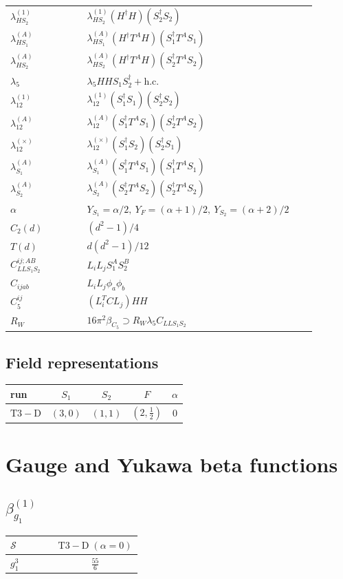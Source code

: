 \documentclass[9pt]{article}
\begin{document}
\begin{longtable}{@{}p{0.23\linewidth}p{0.69\linewidth}@{}}
$\lambda_{HS_2}^{(1)}$ & $\lambda_{HS_2}^{(1)}(H^\dagger H)(S_2^\dagger S_2)$ \\
$\lambda_{HS_1}^{(A)}$ & $\lambda_{HS_1}^{(A)}(H^\dagger T^AH)(S_1^\dagger T^AS_1)$ \\
$\lambda_{HS_2}^{(A)}$ & $\lambda_{HS_2}^{(A)}(H^\dagger T^AH)(S_2^\dagger T^AS_2)$ \\
$\lambda_5$ & $\lambda_5HHS_1S_2^\dagger+\mathrm{h.c.}$ \\
$\lambda_{12}^{(1)}$ & $\lambda_{12}^{(1)}(S_1^\dagger S_1)(S_2^\dagger S_2)$ \\
$\lambda_{12}^{(A)}$ & $\lambda_{12}^{(A)}(S_1^\dagger T^AS_1)(S_2^\dagger T^AS_2)$ \\
$\lambda_{12}^{(\times)}$ & $\lambda_{12}^{(\times)}(S_1^\dagger S_2)(S_2^\dagger S_1)$ \\
$\lambda_{S_1}^{(A)}$ & $\lambda_{S_1}^{(A)}(S_1^\dagger T^A S_1)(S_1^\dagger T^A S_1)$ \\
$\lambda_{S_2}^{(A)}$ & $\lambda_{S_2}^{(A)}(S_2^\dagger T^A S_2)(S_2^\dagger T^A S_2)$ \\
$\alpha$ & $Y_{S_1}=\alpha/2,\ Y_F=(\alpha+1)/2,\ Y_{S_2}=(\alpha+2)/2$ \\
$C_2(d)$ & $(d^2-1)/4$ \\
$T(d)$ & $d(d^2-1)/12$ \\
$C_{LLS_1S_2}^{ij;AB}$ & $L_iL_jS_1^AS_2^B$ \\
$C_{ijab}$ & $L_iL_j\phi_a\phi_b$ \\
$C_5^{ij}$ & $(L_i^TCL_j)HH$ \\
$R_W$ & $16\pi^2\beta_{C_5}\supset R_W\lambda_5C_{LLS_1S_2}$ \\
\bottomrule
\end{longtable}
\subsection*{Field representations}
\begin{longtable}{@{}lcccc@{}}
\toprule
run & $S_1$ & $S_2$ & $F$ & $\alpha$ \\
\midrule
$\mathrm{T3-D}$ & $(3,0)$ & $(1,1)$ & $(2,\frac{1}{2})$ & $0$ \\
\bottomrule
\end{longtable}
\section*{Gauge and Yukawa beta functions}
\subsection*{$ \beta_{g_1}^{(1)} $}
\begin{longtable}{@{}p{0.38\linewidth}c@{}}
\toprule
$\mathcal{S}$ & $ \mathrm{T3-D}\;(\alpha=0) $ \\
\midrule
$ g_1^3 $ & $ \frac{55}{6} $ \\
\bottomrule
\end{longtable}
\end{document}
